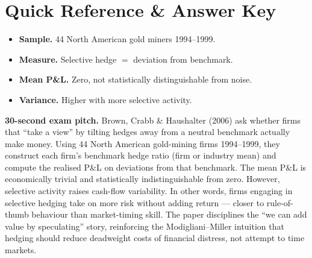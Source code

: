 \documentclass[11pt]{article}
\begin{document}
\section*{Quick Reference \& Answer Key}
\begin{answerbox}
\begin{itemize}
\item \textbf{Sample.} 44 North American gold miners 1994--1999.
\item \textbf{Measure.} Selective hedge $=$ deviation from benchmark.
\item \textbf{Mean P\&L.} Zero, not statistically distinguishable from noise.
\item \textbf{Variance.} Higher with more selective activity.
\end{itemize}
\end{answerbox}

\begin{keybox}
\textbf{30-second exam pitch.} Brown, Crabb \& Haushalter (2006) ask whether firms that ``take a view'' by tilting hedges away from a neutral benchmark actually make money. Using 44 North American gold-mining firms 1994--1999, they construct each firm's benchmark hedge ratio (firm or industry mean) and compute the realised P\&L on deviations from that benchmark. The mean P\&L is economically trivial and statistically indistinguishable from zero. However, selective activity raises cash-flow variability. In other words, firms engaging in selective hedging take on more risk without adding return --- closer to rule-of-thumb behaviour than market-timing skill. The paper disciplines the ``we can add value by speculating'' story, reinforcing the Modigliani--Miller intuition that hedging should reduce deadweight costs of financial distress, not attempt to time markets.
\end{keybox}
\end{document}

